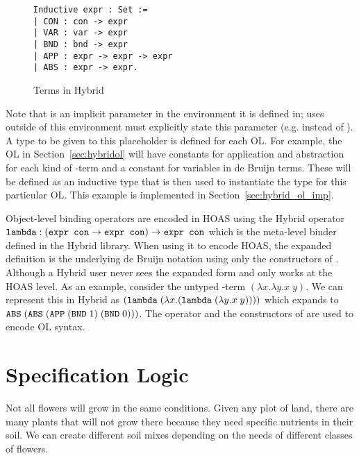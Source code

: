 \begin{figure}
\begin{lstlisting}
Inductive expr : Set :=
| CON : con -> expr
| VAR : var -> expr
| BND : bnd -> expr
| APP : expr -> expr -> expr
| ABS : expr -> expr.
\end{lstlisting}
\caption{Terms in Hybrid \label{fig:expr}}
\end{figure}

Note that  is an implicit parameter in the environment it is defined in; uses outside of this environment must explicitly state this parameter (e.g.  instead of ). A type to be given to this placeholder is defined for each OL. For example, the OL in Section~\ref{sec:hybridol} will have constants for application and abstraction for each kind of \lambda-term and a constant for variables in de Bruijn terms. These will be defined as an inductive type that is then used to instantiate the type  for this particular OL. This example is implemented in Section~\ref{sec:hybrid_ol_imp}.

Object-level binding operators are encoded in HOAS using the Hybrid operator $\texttt{lambda} : (\texttt{expr con} \rightarrow \texttt{expr con}) \rightarrow \texttt{expr con}$ which is the meta-level binder defined in the Hybrid library. When using it to encode HOAS, the expanded definition is the underlying de Bruijn notation using only the constructors of . Although a Hybrid user never sees the expanded form and only works at the HOAS level. As an example, consider the untyped \lambda-term $(\lambda x . \lambda y . x \; y)$. We can represent this in Hybrid as $(\texttt{lambda} \; (\lambda x . (\texttt{lambda} \; (\lambda y . x \; y))))$ which expands to $\texttt{ABS} \; (\texttt{ABS} \; (\texttt{APP} \; (\texttt{BND} \; 1) \; (\texttt{BND} \; 0)))$. The  operator and the constructors of  are used to encode OL syntax.



\section{Specification Logic}
\label{sec:hybridsl}

\begin{sidestory}
Not all flowers will grow in the same conditions. Given any plot of land, there are many plants that will not grow there because they need specific nutrients in their soil. We can create different soil mixes depending on the needs of different classes of flowers.
\end{sidestory}

